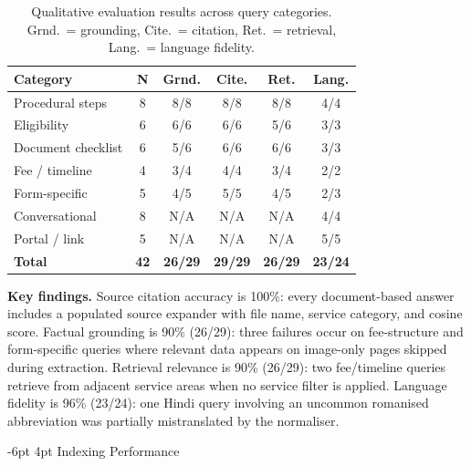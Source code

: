 \documentclass[10pt,twocolumn]{article}
\makeatletter
\renewcommand{\subsection}{\@startsection{subsection}{2}{\z@}%
  {-6pt \@plus -1pt \@minus -0.5pt}%
  {4pt \@plus 0.2pt}%
  {\normalfont\large\bfseries}}
\makeatother
\begin{document}
\begin{table}[ht]
\centering
\small
\caption{Qualitative evaluation results across query categories.
Grnd.\ = grounding, Cite.\ = citation, Ret.\ = retrieval, Lang.\ = language fidelity.}
\label{tab:eval}
\setlength{\tabcolsep}{3pt}
\begin{tabular}{p{2.1cm}ccccc}
\toprule
\textbf{Category} & \textbf{N} & \textbf{Grnd.} & \textbf{Cite.} & \textbf{Ret.} & \textbf{Lang.} \\
\midrule
Procedural steps    & 8  & 8/8  & 8/8  & 8/8  & 4/4 \\
Eligibility         & 6  & 6/6  & 6/6  & 5/6  & 3/3 \\
Document checklist  & 6  & 5/6  & 6/6  & 6/6  & 3/3 \\
Fee / timeline      & 4  & 3/4  & 4/4  & 3/4  & 2/2 \\
Form-specific       & 5  & 4/5  & 5/5  & 4/5  & 2/3 \\
Conversational      & 8  & N/A  & N/A  & N/A  & 4/4 \\
Portal / link       & 5  & N/A  & N/A  & N/A  & 5/5 \\
\midrule
\textbf{Total}      & \textbf{42} & \textbf{26/29} & \textbf{29/29} & \textbf{26/29} & \textbf{23/24} \\
\bottomrule
\end{tabular}
\end{table}

\noindent\textbf{Key findings.}
Source citation accuracy is 100\%: every document-based answer includes a populated
source expander with file name, service category, and cosine score.
Factual grounding is 90\% (26/29): three failures occur on fee-structure and
form-specific queries where relevant data appears on image-only pages skipped during
extraction.  Retrieval relevance is 90\% (26/29): two fee/timeline queries retrieve
from adjacent service areas when no service filter is applied.
Language fidelity is 96\% (23/24): one Hindi query involving an uncommon romanised
abbreviation was partially mistranslated by the normaliser.

\subsection{Indexing Performance}
\end{document}

